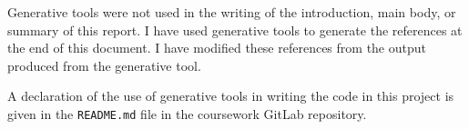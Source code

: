 \documentclass{article}
\begin{document}
Generative tools were not used in the writing of the introduction, main body, or summary of this report. I have used generative tools to generate the references at the end of this document. I have modified these references from the output produced from the generative tool. 

A declaration of the use of generative tools in writing the code in this project is given in the \texttt{README.md} file in the coursework GitLab repository. 



\end{document}

